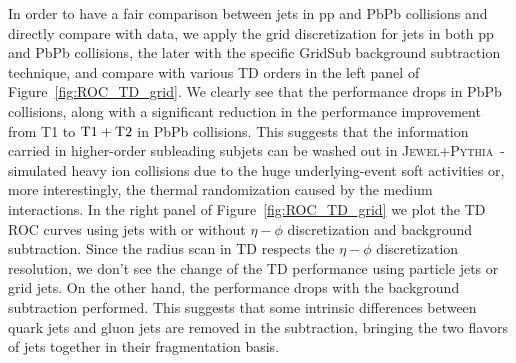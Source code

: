 \documentclass[notoc]{JHEP3}
\newcommand{\jwpy}{\textsc{Jewel+Pythia}~}
\begin{document}
In order to have a fair comparison between jets in pp and PbPb collisions and directly compare with data, we apply the grid discretization for jets in both pp and PbPb collisions, the later with the specific GridSub background subtraction technique, and compare with various TD orders in the left panel of Figure~\ref{fig:ROC_TD_grid}. We clearly see that the performance drops in PbPb collisions, along with a significant reduction in the performance improvement from T1 to $\rm T1+T2$ in PbPb collisions. This suggests that the information carried in higher-order subleading subjets can be washed out in \jwpy-simulated heavy ion collisions due to the huge underlying-event soft activities or, more interestingly, the thermal randomization caused by the medium interactions. In the right panel of Figure~\ref{fig:ROC_TD_grid} we plot the TD ROC curves using jets with or without $\eta-\phi$ discretization and background subtraction. Since the radius scan in TD respects the $\eta-\phi$ discretization resolution, we don't see the change of the TD performance using particle jets or grid jets. On the other hand, the performance drops with the background subtraction performed. This suggests that some intrinsic differences between quark jets and gluon jets are removed in the subtraction, bringing the two flavors of jets together in their fragmentation basis.
\end{document}
